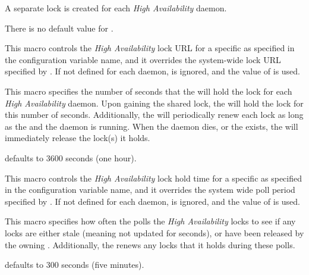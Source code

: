 \begin{description}
  A separate lock is created for each \emph{High Availability} daemon.

  There is no default value for .

\item[\Macro{HA\_daemon\_LOCK\_URL}]
  \label{param:HAdaemonLockURL} This macro controls the 
  \emph{High Availability} lock URL for a specific 
  as specified in the configuration variable name,
  and it overrides the system-wide lock URL specified by
  .  If not defined for each daemon,
   is ignored, and the value of
   is used.

\item[\Macro{HA\_LOCK\_HOLD\_TIME}] \label{param:HALockHoldTime}
  This macro
  specifies the number of seconds that the  will hold the
  lock for each \emph{High Availability} daemon.
  Upon gaining the shared lock,
  the  will hold the lock for this number of seconds.
  Additionally, the  will periodically renew
  each lock as long as the  and the daemon is running.
  When the daemon dies, or the  exists, the
   will immediately release the lock(s) it holds.

   defaults to 3600 seconds (one hour).

\item[\Macro{HA\_daemon\_LOCK\_HOLD\_TIME}]
  \label{param:HAdaemonLockHoldTime}
  This macro controls the \emph{High Availability} lock
  hold time for a specific 
  as specified in the configuration variable name,
  and it overrides the system wide poll period specified by
  .
  If not defined for each daemon,
   is ignored,
  and the value of  is used.

\item[\Macro{HA\_POLL\_PERIOD}] \label{param:HALockPollPeriod} 
  This macro specifies how often the  polls the
  \emph{High Availability} locks to see if any locks are either stale
  (meaning not updated for  seconds),
  or have been released by the owning .
  Additionally, the  renews any locks that it
  holds during these polls.

   defaults to 300 seconds (five minutes).


\end{description}
